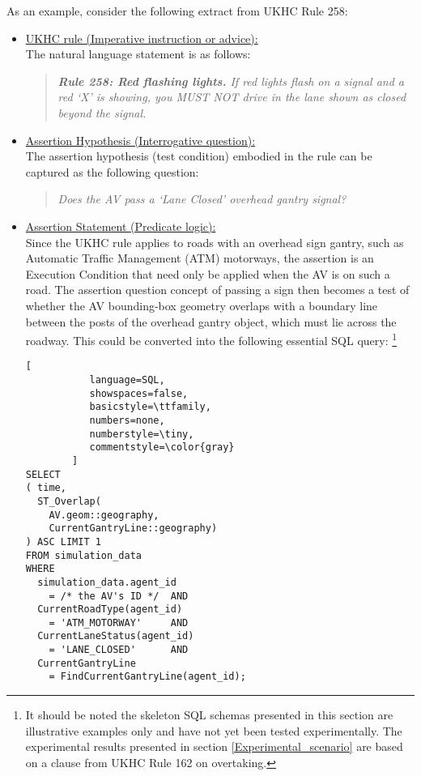 As an example, consider the following extract from UKHC Rule 258:
\\
\begin{itemize}
    \item \underline{UKHC rule (Imperative instruction or advice):}\\
        The natural language statement is as follows:
        \vspace{2mm}
        \begin{quote}
            \textit{\textbf{Rule 258: Red flashing lights.} If red lights flash on a signal and a red `X' is showing, you MUST NOT drive in the lane shown as closed beyond the signal.}\\
        \end{quote}
        \vspace{2mm}
    \item \underline{Assertion Hypothesis (Interrogative question):}\\
        The assertion hypothesis (test condition) embodied in the rule can be captured as the following question:
        \begin{quote}
        	\textit{Does the AV pass a `Lane Closed’ overhead gantry signal?}
        \end{quote}
        \vspace{2mm}
        
    \item \underline{Assertion Statement (Predicate logic):}\\
        Since the UKHC rule applies to roads with an overhead sign gantry, such as Automatic Traffic Management (ATM) motorways, the assertion is an Execution Condition that need only be applied when the AV is on such a road. The assertion question concept of passing a sign then becomes a test of whether the AV bounding-box geometry overlaps with a boundary line between the posts of the overhead gantry object, which must lie across the roadway. This could be converted into the following essential SQL query: \footnote{It should be noted the skeleton SQL schemas presented in this section are illustrative examples only and have not yet been tested experimentally. The experimental results presented in section \ref{Experimental_scenario} are based on a clause from UKHC Rule 162 on overtaking.}\\
    
\begin{lstlisting}[
           language=SQL,
           showspaces=false,
           basicstyle=\ttfamily,
           numbers=none,
           numberstyle=\tiny,
           commentstyle=\color{gray}
        ]
SELECT
( time,
  ST_Overlap(
    AV.geom::geography,
    CurrentGantryLine::geography)
) ASC LIMIT 1
FROM simulation_data
WHERE
  simulation_data.agent_id
    = /* the AV's ID */  AND
  CurrentRoadType(agent_id)
    = 'ATM_MOTORWAY'     AND
  CurrentLaneStatus(agent_id)
    = 'LANE_CLOSED'      AND
  CurrentGantryLine
    = FindCurrentGantryLine(agent_id);
\end{lstlisting} 
    

\end{itemize}

